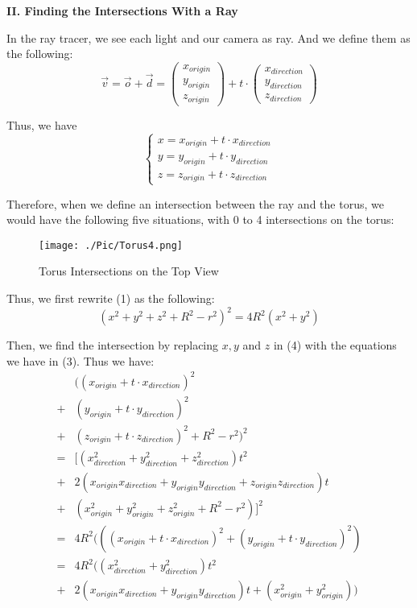\documentclass[a4paper,12pt]{report}
\begin{document}
\noindent
\textbf{II. Finding the Intersections With a Ray}

In the ray tracer, we see each light and our camera as ray. And we define them as the following:
\begin{equation}
\overrightarrow{v} = 
\overrightarrow{o}+\overrightarrow{d}
=
\begin{pmatrix}
x_{origin}\\
y_{origin}\\
z_{origin}
\end{pmatrix} + t \cdot{
\begin{pmatrix}
x_{direction}\\
y_{direction}\\
z_{direction}
\end{pmatrix}}
\end{equation}

Thus, we have 
\begin{equation}
\begin{cases}
x=x_{origin}+t\cdot{x_{direction}}\\
y=y_{origin}+t\cdot{y_{direction}}\\
z=z_{origin}+t\cdot{z_{direction}}
\end{cases}
\end{equation}

\pagebreak
Therefore, when we define an intersection between the ray and the torus, we would have the following five situations, with 0 to 4 intersections on the torus:
\begin{figure}[h]
\centering
\texttt{[image: ./Pic/Torus4.png]}
\caption{Torus Intersections on the Top View}
\end{figure}

Thus, we first rewrite (1) as the following: 
\begin{equation}
(x^2+y^2+z^2+R^2-r^2)^2=4R^2(x^2+y^2)
\end{equation}

Then, we find the intersection by replacing $x,y$ and $z$ in (4) with the equations we have in (3). Thus we have:
\begin{align*}
&((x_{origin}+t\cdot{x_{direction}})^2\\
+&(y_{origin}+t\cdot{y_{direction}})^2\\
+&(z_{origin}+t\cdot{z_{direction}})^2+R^2-r^2)^2\\
=&[(x_{direction}^2+y_{direction}^2+z_{direction}^2)t^2\\
+&2(x_{origin}x_{direction}+y_{origin}y_{direction}+z_{origin}z_{direction})t\\
+&(x_{origin}^2+y_{origin}^2+z_{origin}^2+R^2-r^2)]^2\\
=&4R^2(((x_{origin}+t\cdot{x_{direction}})^2+(y_{origin}+t\cdot{y_{direction}})^2)\\
=&4R^2((x_{direction}^2+y_{direction}^2)t^2\\
+&2(x_{origin}x_{direction}+y_{origin}y_{direction})t+(x_{origin}^2+y_{origin}^2))
\end{align*}
\end{document}
